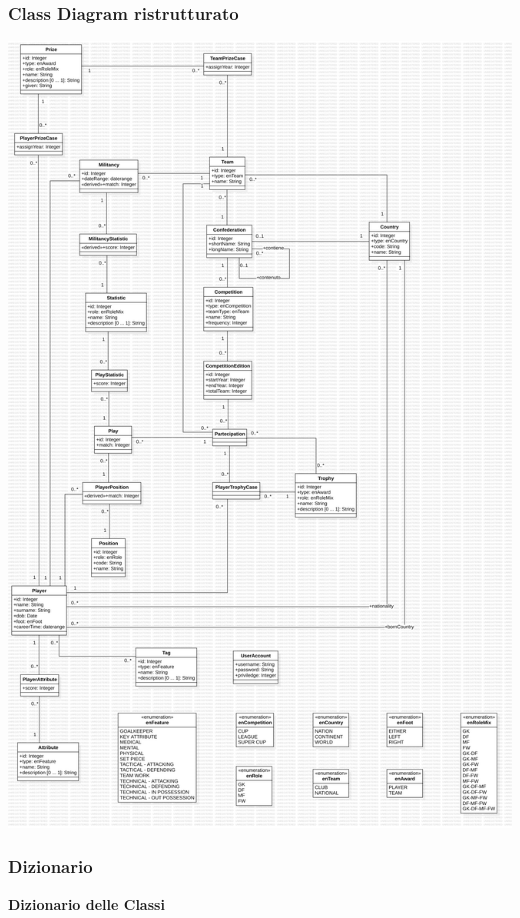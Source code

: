 \newpage
\subsubsection{\Large Class Diagram ristrutturato}
\includegraphics[scale= 0.242]{res/class_diagram_ristr}
\newpage

\subsubsection{\Large Dizionario}

\begin{center}
	\textbf{Dizionario delle Classi}
\end{center}


